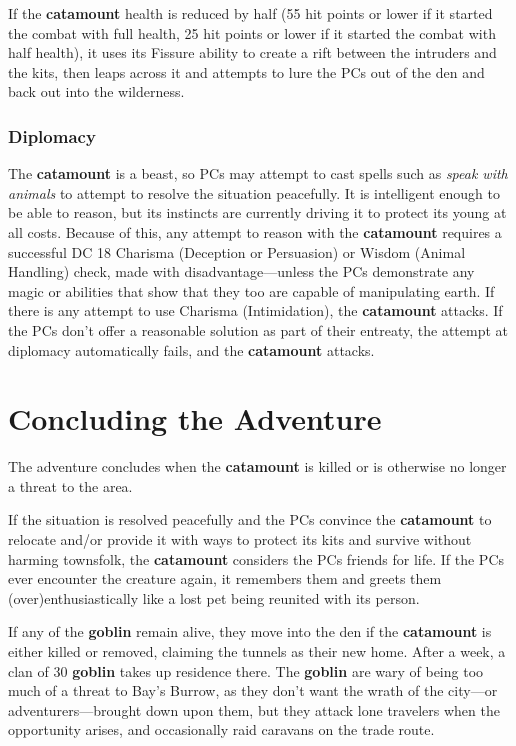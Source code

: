 \documentclass[10pt,a4paper,twoside,bg=print,twocolumn,openany,nodeprecatedcode]{dndbook}
\begin{document}
If the \textbf{catamount} health is reduced by half (55 hit points or lower if it started the combat with full health, 25 hit points or lower if it started the combat with half health), it uses its Fissure ability to create a rift between the intruders and the kits, then leaps across it and attempts to lure the PCs out of the den and back out into the wilderness.

\subsubsection{Diplomacy}
The \textbf{catamount} is a beast, so PCs may attempt to cast spells such as \textit{speak with animals} to attempt to resolve the situation peacefully. It is intelligent enough to be able to reason, but its instincts are currently driving it to protect its young at all costs. Because of this, any attempt to reason with the \textbf{catamount} requires a successful DC 18 Charisma (Deception or Persuasion) or Wisdom (Animal Handling) check, made with disadvantage—unless the PCs demonstrate any magic or abilities that show that they too are capable of manipulating earth. If there is any attempt to use Charisma (Intimidation), the \textbf{catamount} attacks. If the PCs don't offer a reasonable solution as part of their entreaty, the attempt at diplomacy automatically fails, and the \textbf{catamount} attacks.

\section{Concluding the Adventure}
The adventure concludes when the \textbf{catamount} is killed or is otherwise no longer a threat to the area.

If the situation is resolved peacefully and the PCs convince the \textbf{catamount} to relocate and/or provide it with ways to protect its kits and survive without harming townsfolk, the \textbf{catamount} considers the PCs friends for life. If the PCs ever encounter the creature again, it remembers them and greets them (over)enthusiastically like a lost pet being reunited with its person.

If any of the \textbf{goblin} remain alive, they move into the den if the \textbf{catamount} is either killed or removed, claiming the tunnels as their new home. After a week, a clan of 30 \textbf{goblin} takes up residence there. The \textbf{goblin} are wary of being too much of a threat to Bay's Burrow, as they don't want the wrath of the city—or adventurers—brought down upon them, but they attack lone travelers when the opportunity arises, and occasionally raid caravans on the trade route.
\end{document}
